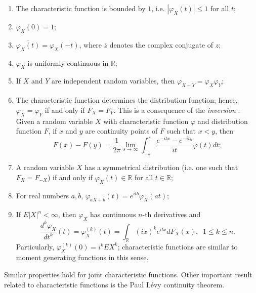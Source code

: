 \documentclass[12pt]{article}
\begin{document}
\begin{enumerate}
\item The characteristic function is bounded by $1$, i.e. $|\varphi_X(t)|\leq 1$ for all $t$;
\item $\varphi_X(0)=1$;
\item $\overline{\varphi_X(t)} = \varphi_X(-t)$, where $\overline{z}$ denotes the complex conjugate of $z$;
\item $\varphi_X$ is uniformly continuous in $\mathbb{R}$;
\item If $X$ and $Y$ are independent random variables, then $\varphi_{X+Y} = \varphi_X\varphi_Y$;
\item The characteristic function determines the distribution function; hence, $\varphi_X=\varphi_Y$ if and only if $F_X = F_Y$.
This is a consequence of the \emph{inversion }: Given a random variable $X$
with characteristic function $\varphi$ and distribution function $F$, if $x$ and $y$
are continuity points of $F$ such that $x<y$, then
\[F(x) - F(y) = \frac{1}{2\pi}\lim_{s\rightarrow\infty}\int_{-s}^s
\frac{e^{-itx}-e^{-ity}}{it}\varphi(t)dt;\]
\item A random variable $X$ has a symmetrical distribution (i.e. one such that $F_X = F_{-X}$)
if and only if $\varphi_X(t)\in \mathbb{R}$ for all $t\in \mathbb{R}$;
\item For real numbers $a,b$, $\varphi_{aX+b}(t) = e^{itb}\varphi_X(at)$;
\item If $E|X|^n<\infty$, then $\varphi_X$ has continuous $n$-th derivatives and
\[\frac{d^k\varphi_X}{dt^k}(t) = \varphi_X^{(k)}(t)=\int_\mathbb{R}(ix)^ke^{itx}dF_X(x), \;\; 1\leq k\leq n.\]
Particularly, $\varphi_X^{(k)}(0)=i^kEX^k$; characteristic functions are similar to
moment generating functions in this sense.
\end{enumerate}

Similar properties hold for joint characteristic functions.
Other important result related to characteristic functions is the Paul L\'evy
continuity theorem.
\end{document}
